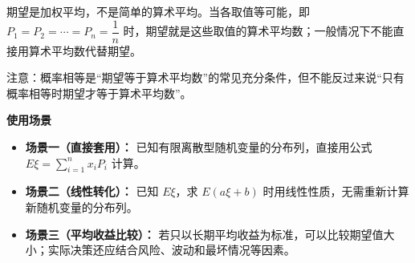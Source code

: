 \begin{explanationbox}
	期望是加权平均，不是简单的算术平均。当各取值等可能，即 $P_1=P_2=\cdots=P_n=\dfrac1n$ 时，期望就是这些取值的算术平均数；一般情况下不能直接用算术平均数代替期望。

	注意：概率相等是“期望等于算术平均数”的常见充分条件，但不能反过来说“只有概率相等时期望才等于算术平均数”。

	\medskip
	\textbf{\textcolor{CExplanation}{使用场景}}
	\begin{itemize}[leftmargin=*, itemsep=0.5em, topsep=0.4em]
		\item \textbf{场景一（直接套用）：} 已知有限离散型随机变量的分布列，直接用公式 $E\xi=\sum_{i=1}^{n}x_iP_i$ 计算。
		\item \textbf{场景二（线性转化）：} 已知 $E\xi$，求 $E(a\xi+b)$ 时用线性性质，无需重新计算新随机变量的分布列。
		\item \textbf{场景三（平均收益比较）：} 若只以长期平均收益为标准，可以比较期望值大小；实际决策还应结合风险、波动和最坏情况等因素。
	\end{itemize}
\end{explanationbox}